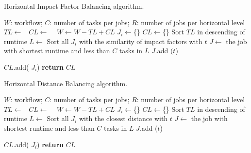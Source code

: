 \begin{algorithm}[!htb]
	\footnotesize
	\caption{Horizontal Impact Factor Balancing algorithm.}
	\label{alg:imbalance_hifb}
	\begin{algorithmic}[1]
		\Require $W$: workflow; $C$: number of tasks per jobs; $R$: number of jobs per horizontal level
				\State $TL\gets $\  
				\State $CL\gets$  \  
				\State $W \gets W - TL + CL$   
			\EndFor
		\EndProcedure
			\State $J_i\gets$\{\}
			\EndFor
			\State $CL\gets$\{\}
			\State Sort $TL$ in descending of runtime
				\State $L\gets$ Sort all $J_i$ with the similarity of impact factors with $t$
				\State $J\gets$ the job with shortest runtime and less than $C$ tasks in $L$
				\State $J$.add ($t$) 
				
			\EndFor
			\State  $CL$.add( $J_i$)
			\EndFor
			\State \textbf{return} $CL$
		\EndProcedure
	\end{algorithmic}
\end{algorithm}


\begin{algorithm}[!htb]
	\footnotesize
	\caption{Horizontal Distance Balancing algorithm.}
	\label{alg:imbalance_hdb}
	\begin{algorithmic}[1]
		\Require $W$: workflow; $C$: number of tasks per jobs; $R$: number of jobs per horizontal level
				\State $TL\gets $\  
				\State $CL\gets$  \  
				\State $W \gets W - TL + CL$   
			\EndFor
		\EndProcedure
			\State $J_i\gets$\{\}
			\EndFor
			\State $CL\gets$\{\}
			\State Sort $TL$ in descending of runtime
				\State $L\gets$ Sort all $J_i$ with the closest distance with $t$
				\State $J\gets$ the job with shortest runtime and less than $C$ tasks in $L$
				\State $J$.add ($t$) 
				
			\EndFor
			\State  $CL$.add( $J_i$)
			\EndFor
			\State \textbf{return} $CL$
		\EndProcedure
	\end{algorithmic}
\end{algorithm}


